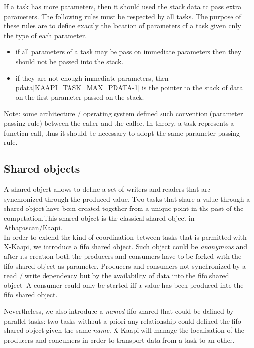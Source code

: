 \documentclass{report}
\newcommand{\kaapi}{\textsc{X}-Kaapi\xspace}
\newcommand{\new}{}
\begin{document}
If a task has more parameters, then it should used the stack data to pass extra parameters. The following rules must be respected by all tasks. The purpose of these rules are to define exactly the location of parameters of a task given only the type
of each parameter.
\begin{itemize}
\item if all parameters of a task may be pass on immediate parameters then they should not be passed into the stack.
\item if they are not enough immediate parameters, then pdata[{\small KAAPI\_TASK\_MAX\_PDATA-1}] is the pointer to the stack of data on the first parameter passed on the stack.
\end{itemize}
Note: some architecture / operating system defined such convention (parameter passing rule) between the caller and the callee. In theory, a task represents a function call, thus it should be necessary to adopt the same parameter passing rule.


\subsection{Shared objects}
A shared object allows to define a set of writers and readers that are synchronized through the produced value.
Two tasks that share a value through a shared object have been created together from a unique point in the past of the computation.This shared object is the classical shared object in Athapascan/Kaapi.\\

\new
In order to extend the kind of coordination between tasks that is permitted with \kaapi, we introduce a fifo shared object. Such object could be \textit{anonymous} and after its creation both the producers and consumers have to be forked with the fifo shared object as parameter. Producers and consumers not synchronized by a read / write dependency but by the availability of data into the fifo shared object. A consumer could only be started iff a value has been produced into the fifo shared object.

Nevertheless, we also introduce a \textit{named} fifo shared that could be defined by parallel tasks: two tasks without a priori any relationship could defined the fifo shared object given the same \textit{name}. \kaapi will manage the localisation of the producers and concumers in order to transport data from a task to an other.
\end{document}

